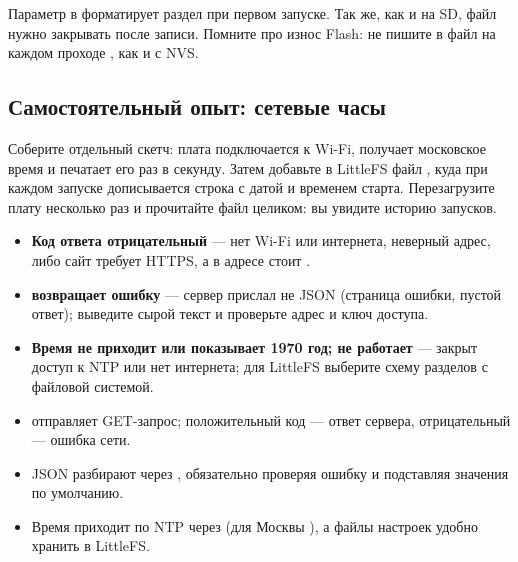 
Параметр  в  форматирует раздел при первом запуске. Так же, как
и на SD, файл нужно закрывать после записи. Помните про износ Flash: не пишите в файл на каждом
проходе , как и с NVS.

\subsection{Самостоятельный опыт: сетевые часы}

Соберите отдельный скетч: плата подключается к Wi-Fi, получает московское время и печатает его раз в секунду.
Затем добавьте в LittleFS файл , куда при каждом запуске дописывается строка с датой и временем
старта. Перезагрузите плату несколько раз и прочитайте файл целиком: вы увидите историю запусков.

\begin{trouble}
\begin{itemize}[leftmargin=*]
  \item \textbf{Код ответа отрицательный} --- нет Wi-Fi или интернета, неверный адрес, либо сайт требует HTTPS, а в адресе стоит .
  \item \textbf{ возвращает ошибку} --- сервер прислал не JSON (страница ошибки, пустой ответ); выведите сырой текст и проверьте адрес и ключ доступа.
  \item \textbf{Время не приходит или показывает 1970 год;  не работает} --- закрыт доступ к NTP или нет интернета; для LittleFS выберите схему разделов с файловой системой.
\end{itemize}
\end{trouble}

\begin{summary}
\begin{itemize}[leftmargin=*]
  \item {} отправляет GET-запрос; положительный код --- ответ сервера, отрицательный --- ошибка сети.
  \item JSON разбирают через , обязательно проверяя ошибку и подставляя значения по умолчанию.
  \item Время приходит по NTP через  (для Москвы ), а файлы настроек удобно хранить в LittleFS.
\end{itemize}
\end{summary}

